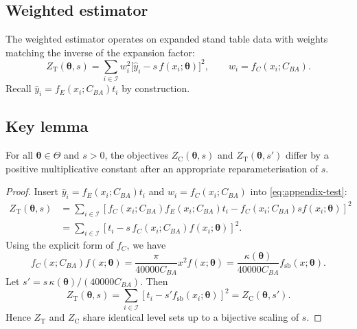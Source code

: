 \subsection{Weighted estimator}

The weighted estimator operates on expanded stand table data with weights
matching the inverse of the expansion factor:
\begin{equation}
  Z_{\mathrm{T}}(\boldsymbol{\theta}, s)
  =
  \sum_{i \in \mathcal{I}}
  w_i^2 
  \Big[\hat{y}_i - s\, f(x_i; \boldsymbol{\theta})\Big]^2,
  \qquad
  w_i = f_C(x_i; C_{BA}).
  \label{eq:appendix-test}
\end{equation}
Recall $\hat{y}_i = f_E(x_i; C_{BA}) t_i$ by construction.

\subsection{Key lemma}

\begin{lemma}
For all $\boldsymbol{\theta}\in\Theta$ and $s>0$, the objectives
$Z_{\mathrm{C}}(\boldsymbol{\theta}, s)$ and $Z_{\mathrm{T}}(\boldsymbol{\theta}, s')$ differ
by a positive multiplicative constant after an appropriate reparameterisation of
$s$.
\end{lemma}

\begin{proof}
Insert $\hat{y}_i = f_E(x_i; C_{BA}) t_i$ and $w_i = f_C(x_i; C_{BA})$ into
\eqref{eq:appendix-test}:
\begin{align}
  Z_{\mathrm{T}}(\boldsymbol{\theta}, s)
    &= \sum_{i \in \mathcal{I}} \left[f_C(x_i; C_{BA}) f_E(x_i; C_{BA}) t_i
      - f_C(x_i; C_{BA}) s f(x_i; \boldsymbol{\theta})\right]^2 \\
    &= \sum_{i \in \mathcal{I}} \left[t_i - s \, f_C(x_i; C_{BA}) f(x_i; \boldsymbol{\theta})\right]^2.
\end{align}
Using the explicit form of $f_C$, we have
\begin{equation}
  f_C(x; C_{BA}) f(x; \boldsymbol{\theta})
  =
  \frac{\pi}{40000 C_{BA}} x^{2} f(x;\boldsymbol{\theta})
  =
  \frac{\kappa(\boldsymbol{\theta})}{40000 C_{BA}} f_{\mathrm{sb}}(x; \boldsymbol{\theta}).
\end{equation}
Let $s' = s\, \kappa(\boldsymbol{\theta})/(40000 C_{BA})$. Then
\begin{equation}
  Z_{\mathrm{T}}(\boldsymbol{\theta}, s)
  =
  \sum_{i \in \mathcal{I}} \left[t_i - s' f_{\mathrm{sb}}(x_i; \boldsymbol{\theta})\right]^2
  =
  Z_{\mathrm{C}}(\boldsymbol{\theta}, s').
\end{equation}
Hence $Z_{\mathrm{T}}$ and $Z_{\mathrm{C}}$ share identical level sets up to a
bijective scaling of $s$.
\end{proof}

